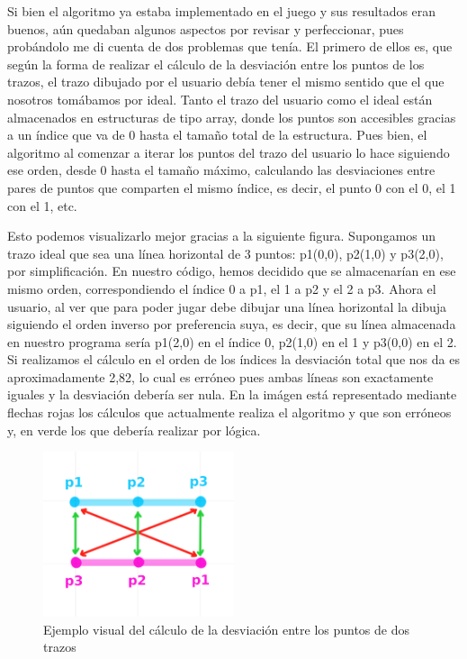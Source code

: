 \vspace{0.5cm}

Si bien el algoritmo ya estaba implementado en el juego y sus resultados eran buenos, aún quedaban algunos aspectos por revisar y perfeccionar, pues probándolo me di cuenta de dos problemas que tenía. El primero de ellos es, que según la forma de realizar el cálculo de la desviación entre los puntos de los trazos, el trazo dibujado por el usuario debía tener el mismo sentido que el que nosotros tomábamos por ideal. Tanto el trazo del usuario como el ideal están almacenados en estructuras de tipo array, donde los puntos son accesibles gracias a un índice que va de 0 hasta el tamaño total de la estructura. Pues bien, el algoritmo al comenzar a iterar los puntos del trazo del usuario lo hace siguiendo ese orden, desde 0 hasta el tamaño máximo, calculando las desviaciones entre pares de puntos que comparten el mismo índice, es decir, el punto 0 con el 0, el 1 con el 1, etc.

\vspace{0.5cm}

Esto podemos visualizarlo mejor gracias a la siguiente figura. Supongamos un trazo ideal que sea una línea horizontal de 3 puntos: p1(0,0), p2(1,0) y p3(2,0), por simplificación. En nuestro código, hemos decidido que se almacenarían en ese mismo orden, correspondiendo el índice 0 a p1, el 1 a p2 y el 2 a p3. Ahora el usuario, al ver que para poder jugar debe dibujar una línea horizontal la dibuja siguiendo el orden inverso por preferencia suya, es decir, que su línea almacenada en nuestro programa sería p1(2,0) en el índice 0, p2(1,0) en el 1 y p3(0,0) en el 2. Si realizamos el cálculo en el orden de los índices la desviación total que nos da es aproximadamente 2,82, lo cual es erróneo pues ambas líneas son exactamente iguales y la desviación debería ser nula. En la imágen está representado mediante flechas rojas los cálculos que actualmente realiza el algoritmo y que son erróneos y, en verde los que debería realizar por lógica.

\vspace{0.5cm}

\begin{figure}[htbp]
\centering
  \includegraphics[width=0.5\textwidth]{archivos/findnearest.png}
  \caption{Ejemplo visual del cálculo de la desviación entre los puntos de dos trazos}
  \label{fig:findnearest}
\end{figure}

